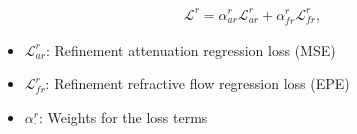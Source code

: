 \documentclass[landscape,a0paper,fontscale=0.292]{baposter}
\begin{document}
\begin{poster}
{\begin{minipage}[t]{0.48\linewidth}
    \begin{align}
        \mathcal{L}^r = \alpha^r_{ar} \mathcal{L}^r_{ar} + \alpha^r_{fr} \mathcal{L}^r_{fr} ,
    \end{align}
  \begin{itemize}
    \vspace{-0.5em}
      \item $\mathcal{L}^r_{ar}$: Refinement attenuation regression loss (MSE)
      \item $\mathcal{L}^r_{fr}$: Refinement refractive flow regression loss (EPE)
      \item $\alpha^{r}_{\cdot}$: Weights for the loss terms
  \end{itemize}
  \end{minipage}

}


\end{poster}
\end{document}
